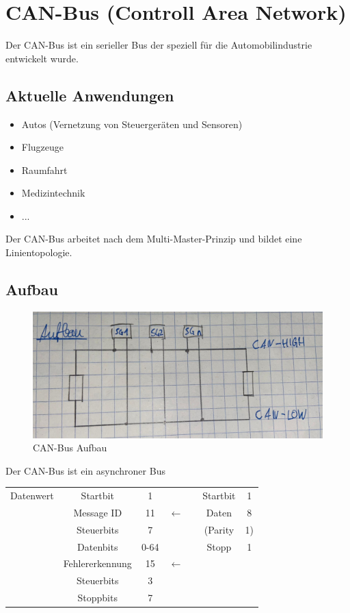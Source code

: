 \section{CAN-Bus (Controll Area Network)}
Der CAN-Bus ist ein serieller Bus der speziell für die Automobilindustrie entwickelt wurde.

\subsection*{Aktuelle Anwendungen}
\begin{itemize}
	\item Autos (Vernetzung von Steuergeräten und Sensoren)
	\item Flugzeuge
	\item Raumfahrt
	\item Medizintechnik
	\item ...
\end{itemize}
Der CAN-Bus arbeitet nach dem Multi-Master-Prinzip und bildet eine Linientopologie.

\subsection*{Aufbau}
\begin{figure}[H]
	\centering
	\includegraphics[width=0.8\linewidth]{figures/canbus.jpeg}
	\caption{CAN-Bus Aufbau}
\end{figure}
Der CAN-Bus ist ein asynchroner Bus \\

\begin{tabular}{ccccccc}
	Datenwert & Startbit & 1 & \checkmark && Startbit & 1 \\
	& Message ID & 11 & $\leftarrow$ && Daten & 8 \\
	& Steuerbits & 7 & \checkmark && (Parity & 1) \\
	& Datenbits & 0-64 & \checkmark && Stopp & 1 \\
	& Fehlererkennung & 15 & $\leftarrow$ &&  &  \\
	& Steuerbits & 3 & \checkmark &&  &  \\
	& Stoppbits & 7 & \checkmark &&  &  \\
\end{tabular}

